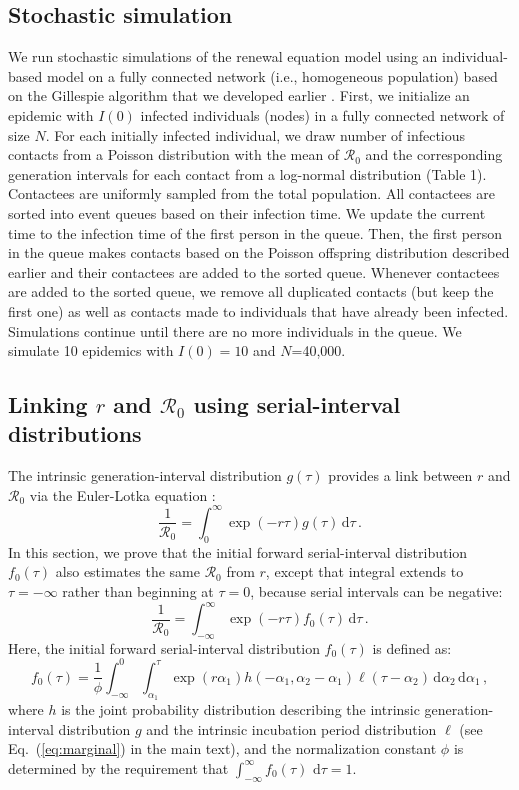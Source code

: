 \documentclass[12pt]{article}
\newcommand{\eref}[1]{Eq.~(\ref{eq:#1})}
\newcommand{\Rx}[1]{\ensuremath{{\mathcal R}_{#1}}\xspace}
\newcommand{\Ro}{\Rx{0}}
\newcommand{\dd}[1]{\ensuremath{\, \mathrm{d}#1}}
\newcommand{\dtau}{\dd{\tau}}
\newcommand{\gdist}{g} %
\newcommand{\idist}{\ell} %
\begin{document}
\subsection{Stochastic simulation}

We run stochastic simulations of the renewal equation model using an individual-based model on a fully connected network (i.e., homogeneous population) based on the Gillespie algorithm that we developed earlier \citep{park2019inferring}.
First, we initialize an epidemic with $I(0)$ infected individuals (nodes) in a fully connected network of size $N$. 
For each initially infected individual, we draw number of infectious contacts from a Poisson distribution with the mean of \Ro and the corresponding generation intervals for each contact from a log-normal distribution (Table 1).
Contactees are uniformly sampled from the total population.
All contactees are sorted into event queues based on their infection time.
We update the current time to the infection time of the first person in the queue.
Then, the first person in the queue makes contacts based on the Poisson offspring distribution described earlier and their contactees are added to the sorted queue.
Whenever contactees are added to the sorted queue, we remove all duplicated contacts (but keep the first one) as well as contacts made to individuals that have already been infected.
Simulations continue until there are no more individuals in the queue.
We simulate 10 epidemics with $I(0)=10$ and $N$=40,000.

\subsection{Linking $r$ and \Ro using serial-interval distributions}

The intrinsic generation-interval distribution $\gdist(\tau)$ provides a link between $r$ and \Ro via the Euler-Lotka equation \citep{wallinga2007generation}:
\begin{equation}
\frac{1}{\Ro} = \int_0^\infty \exp(-r\tau) \gdist(\tau) \dtau\,.
\end{equation}
In this section, we prove that the initial forward serial-interval distribution $f_0(\tau)$ also estimates the same \Ro from $r$, except that integral extends to $\tau=-\infty$ rather than beginning at $\tau=0$, because serial intervals can be negative:
\begin{equation}
\frac{1}{\Ro} = \int_{-\infty}^\infty \exp(-r\tau) f_{0}(\tau) \dtau\,.
\label{eq:ptarget}
\end{equation}
Here, the initial forward serial-interval distribution $f_{0}(\tau)$ is defined as:
\begin{equation}
f_{0}(\tau) = \frac{1}{\phi} \int_{-\infty}^{0} \int_{\alpha_1}^{\tau} \exp(r \alpha_1) h(-\alpha_1, \alpha_2 - \alpha_1) \idist(\tau - \alpha_2) \, \mathrm{d}\alpha_2\,\mathrm{d}\alpha_1\,,
\label{eq:fdist}
\end{equation}
where $h$ is the joint probability distribution describing the
intrinsic generation-interval distribution $g$ and the intrinsic
incubation period distribution $\idist$ (see \eref{marginal} in the
main text), and the normalization constant $\phi$ is determined by the
requirement that $\int_{-\infty}^\infty f_{0}(\tau)\,\dtau=1$.
\end{document}
